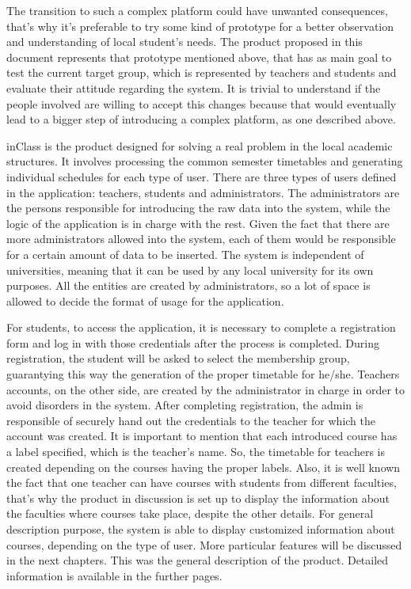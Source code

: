The transition to such a complex platform could have unwanted consequences, that's why it's preferable to try some kind of prototype for a better observation and understanding of local student's needs. The product proposed in this document represents that prototype mentioned above, that has as main goal to test the current target group, which is represented by teachers and students and evaluate their attitude regarding the system. It is trivial to understand if the people involved are willing to accept this changes because that would eventually lead to a bigger step of introducing a complex platform, as one described above. 

inClass is the product designed for solving a real problem in the local academic structures. It involves processing the common semester timetables and generating individual schedules for each type of user. There are three types of users defined in the application: teachers, students and administrators. The administrators are the persons responsible for introducing the raw data into the system, while the logic of the application is in charge with the rest. Given the fact that there are more administrators allowed into the system, each of them would be responsible for a certain amount of data to be inserted. The system is independent of universities, meaning that it can be used by any local university for its own purposes. All the entities are created by administrators, so a lot of space is allowed to decide the format of usage for the application. 

For students, to access the application, it is necessary to complete a registration form and log in with those credentials after the process is completed. During registration, the student will be asked to select the membership group, guarantying this way the generation of the proper timetable for he/she. Teachers accounts, on the other side, are created by the administrator in charge in order to avoid disorders in the system. After completing registration, the admin is responsible of securely hand out the credentials to the teacher for which the account was created. It is important to mention that each introduced course has a label specified, which is the teacher's name. So, the timetable for teachers is created depending on the courses having the proper labels. Also, it is well known the fact that one teacher can have courses with students from different faculties, that's why the product in discussion is set up to display the information about the faculties where courses take place, despite the other details. For general description purpose, the system is able to display customized information about courses, depending on the type of user. More particular features will be discussed in the next chapters. This was the general description of the product. Detailed information is available in the further pages.

